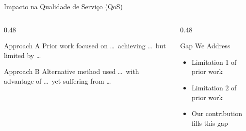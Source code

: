 \documentclass[aspectratio=169]{beamer}
\begin{document}
\begin{frame}{Impacto na Qualidade de Serviço (QoS)}
  \begin{columns}[T]
    \begin{column}{0.48\textwidth}
      \begin{block}{Approach A}
        Prior work focused on \ldots\ achieving \ldots\ but limited by \ldots
      \end{block}
      \vspace{0.5em}
      \begin{block}{Approach B}
        Alternative method used \ldots\ with advantage of \ldots\ yet suffering from \ldots
      \end{block}
    \end{column}
    \begin{column}{0.48\textwidth}
      \begin{block}{Gap We Address}
        \begin{itemize}
          \item Limitation 1 of prior work
          \item Limitation 2 of prior work
          \item Our contribution fills this gap
        \end{itemize}
      \end{block}
    \end{column}
  \end{columns}
\end{frame}
\end{document}
